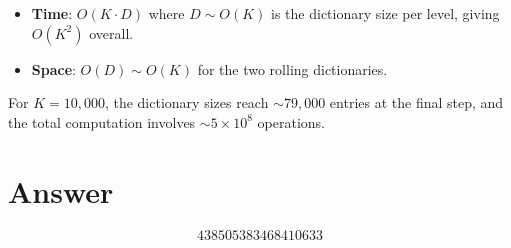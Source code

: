 \documentclass[11pt,a4paper]{article}
\begin{document}
\begin{itemize}
    \item \textbf{Time}: $O(K \cdot D)$ where $D \sim O(K)$ is the dictionary size per level, giving $O(K^2)$ overall.
    \item \textbf{Space}: $O(D) \sim O(K)$ for the two rolling dictionaries.
\end{itemize}

For $K = 10{,}000$, the dictionary sizes reach ${\sim}79{,}000$ entries at the final step, and the total computation involves ${\sim}5 \times 10^8$ operations.

\section{Answer}

\[
\boxed{438505383468410633}
\]
\end{document}
